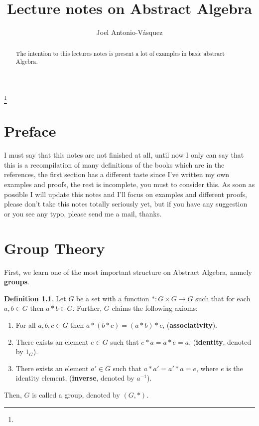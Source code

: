 \documentclass[11pt]{amsbook}%
\newcommand{\ii}{\item}
\theoremstyle{plain}
\theoremstyle{definition}
\newtheorem{definition*}{Definition}
\numberwithin{equation}{section}
\begin{document}
\frontmatter
\title[notes]{Lecture notes on Abstract Algebra}
\author[Joel Antonio-V\'asquez]{Joel Antonio-V\'asquez}
\address{Ica, Peru}
\thanks{}%
\subjclass{}%

\begin{abstract}
  The intention to this lectures notes is present a lot
  of examples in basic abstract Algebra.
\end{abstract}
\maketitle
\tableofcontents


\chapter*{Preface}

I must say that this notes are not finished at all, until now I only can say that this is
a recompilation of many definitions of the books which are in the references, the first
section has a different taste since I’ve written my own examples and proofs, the rest is incomplete,
you must to consider this. As soon as possible I will update this notes and I'll focus on
examples and different proofs, please don’t take this notes totally seriously yet, but
if you have any suggestion or you see any typo, please send me a mail, thanks.

\mainmatter


\chapter{Group Theory}
First, we learn one of the most important structure on Abstract Algebra,
namely \textbf{groups}.

\begin{definition*}
  \label{def-group}
  Let $G$ be a set with a function $*: G \times G \longrightarrow G$ such that
  for each $a, b \in G$ then $a * b \in G$. Further, $G$ claims the following
  axioms: 
  \begin{enumerate}[G1. ]
      \ii For all $a, b, c \in G$ then $a*(b*c) = (a*b)*c$, (\textbf{associativity}).
      \ii There exists an element $e \in G$ such that $e*a = a*e = a$, (\textbf{identity}, denoted by $1_{G}$).
      \ii There exists an element $a' \in G$ such that $a*a' = a'*a = e$,
      where $e$ is the identity element, (\textbf{inverse}, denoted by $a^{-1}$).
  \end{enumerate} 
  Then, $G$ is called a group, denoted by $(G, *)$.
\end{definition*} 
\end{document}
